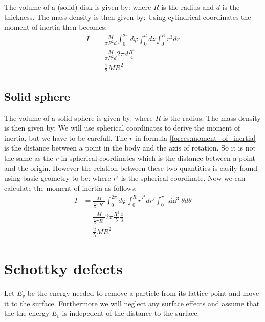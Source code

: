 	The volume of a (solid) disk is given by:
	where $R$ is the radius and $d$ is the thickness. The mass density is then given by:
	Using cylindrical coordinates the moment of inertia then becomes:
	\begin{align}
		I &= \frac{M}{\pi R^2d}\int_0^{2\pi}d\varphi\int_0^ddz\int_0^Rr^3dr\\
		&= \frac{M}{\pi R^2d}2\pi d\frac{R^4}{4}\\
		&= \frac{1}{2}MR^2
	\end{align}
	
\subsection{Solid sphere}

	The volume of a solid sphere is given by:
	where $R$ is the radius. The mass density is then given by:
	We will use spherical coordinates to derive the moment of inertia, but we have to be carefull. The $r$ in formula \ref{forces:moment_of_inertia} is the distance between a point in the body and the axis of rotation. So it is not the same as the $r$ in spherical coordinates which is the distance between a point and the origin. However the relation between these two quantities is easily found using basic geometry to be:
	where $r'$ is the spherical coordinate. Now we can calculate the moment of inertia as follows:
	\begin{align}
		I &= \frac{M}{\frac{4}{3}\pi R^3} \int_0^{2\pi}d\varphi\int_0^Rr'^{^4}dr'\int_0^\pi\sin^3\theta d\theta\\
		&= \frac{M}{\frac{4}{3}\pi R^3} 2\pi \frac{R^5}{5} \frac{4}{3}\\
		&= \frac{2}{5}MR^2
	\end{align}

\section{Schottky defects}\label{deriv:schottky_defects}
	Let $E_v$ be the energy needed to remove a particle from its lattice point and move it to the surface. Furthermore we will neglect any surface effects and assume that the the energy $E_v$ is indepedent of the distance to the surface.
    

